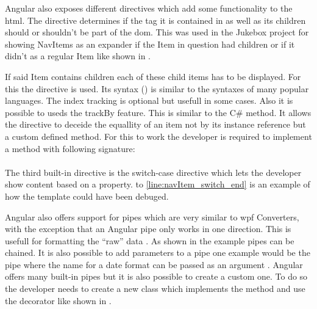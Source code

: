 
Angular also exposes different directives which add some functionality to the \gls{html}. The  directive determines if the tag it is contained in as well as its children should or shouldn't be part of the \gls{dom}. This was used in the Jukebox project for showing NavItems as an expander if the Item in question had children or if it didn't as a regular Item like shown in .

If said Item contains children each of these child items has to be displayed. For this the  directive is used. Its syntax () is similar to the  syntaxes of many popular languages. The index tracking is optional but usefull in some cases. Also it is possible to useds the trackBy feature. This is similar to the  C\# method. It allows the  directive to deceide the equallity of an item not by its instance reference but a custom defined method. For this to work the developer is required to implement a method with following signature:\\
\\

The third built-in directive is the switch-case directive which lets the developer show content based on a property.  to \ref{line:navItem_switch_end} is an example of how the  template could have been debuged.


Angular also offers support for pipes which are very similar to \gls{wpf} Converters, with the exception that an Angular pipe only works in one direction. This is usefull for formatting the \enquote{raw} data \zB {}. As shown in the example pipes can be chained. It is also possible to add parameters to a pipe one example would be the  pipe where the name for a date format can be passed as an argument \zB {}. Angular offers many built-in pipes but it is also possible to create a custom one. To do so the developer needs to create a new class which implements the  method and use the  decorator like shown in .

